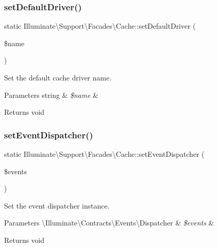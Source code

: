 \subsubsection{\texorpdfstring{set\+Default\+Driver()}{setDefaultDriver()}}
{\footnotesize\ttfamily static Illuminate\textbackslash{}\+Support\textbackslash{}\+Facades\textbackslash{}\+Cache\+::set\+Default\+Driver (\begin{DoxyParamCaption}\item[{}]{\$name }\end{DoxyParamCaption})\hspace{0.3cm}{\ttfamily [static]}}

Set the default cache driver name.


\begin{DoxyParams}[1]{Parameters}
string & {\em \$name} & \\
\hline
\end{DoxyParams}
\begin{DoxyReturn}{Returns}
void 
\end{DoxyReturn}
\mbox{\label{class_illuminate_1_1_support_1_1_facades_1_1_cache_aac5b4b794ac19fbd44e66d46a9e298ba}} 
\subsubsection{\texorpdfstring{set\+Event\+Dispatcher()}{setEventDispatcher()}}
{\footnotesize\ttfamily static Illuminate\textbackslash{}\+Support\textbackslash{}\+Facades\textbackslash{}\+Cache\+::set\+Event\+Dispatcher (\begin{DoxyParamCaption}\item[{}]{\$events }\end{DoxyParamCaption})\hspace{0.3cm}{\ttfamily [static]}}

Set the event dispatcher instance.


\begin{DoxyParams}[1]{Parameters}
\textbackslash{}\+Illuminate\textbackslash{}\+Contracts\textbackslash{}\+Events\textbackslash{}\+Dispatcher & {\em \$events} & \\
\hline
\end{DoxyParams}
\begin{DoxyReturn}{Returns}
void 
\end{DoxyReturn}
\mbox{\label{class_illuminate_1_1_support_1_1_facades_1_1_cache_ae003e01cbfd273316452592dac9899cc}} 
